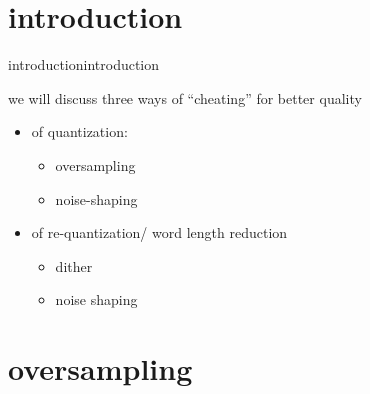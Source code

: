 


\subtitle{Part 14: Improving (Re-)Quantization Quality}


	

\section[intro]{introduction}
	\begin{frame}{introduction}{introduction}
        
        \bigskip
        we will discuss three ways of ``cheating'' for better quality
        \begin{itemize}
            \item   of quantization:
                \begin{itemize}
                    \item   oversampling
                    \item   noise-shaping
                \end{itemize}
            \smallskip
            \item   of re-quantization/ word length reduction
                \begin{itemize}
                    \item   dither
                    \item   noise shaping
                \end{itemize}
        \end{itemize}
    \end{frame}
\section{oversampling}

